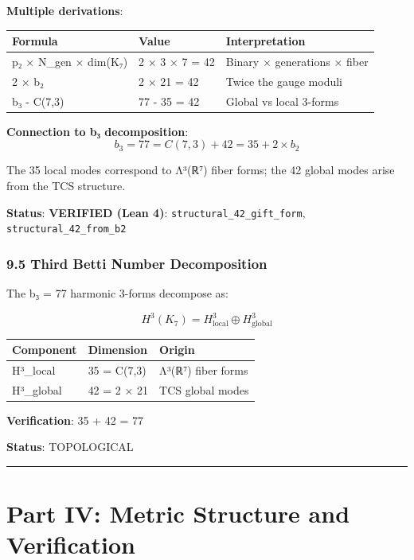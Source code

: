 \documentclass[11pt,a4paper]{article}
\begin{document}
{{{{{{{{{{{{{{{{{\textbf{Multiple derivations}:

{\def\LTcaptype{none} %
\begin{longtable}[]{@{}lll@{}}
\toprule\noalign{}
Formula & Value & Interpretation \\
\midrule\noalign{}
\endhead
\bottomrule\noalign{}
\endlastfoot
p₂ × N\_gen × dim(K₇) & 2 × 3 × 7 = 42 & Binary × generations × fiber \\
2 × b₂ & 2 × 21 = 42 & Twice the gauge moduli \\
b₃ - C(7,3) & 77 - 35 = 42 & Global vs local 3-forms \\
\end{longtable}
\textbf{Connection to b₃ decomposition}:
\[b_3 = 77 = C(7,3) + 42 = 35 + 2 \times b_2\]

The 35 local modes correspond to Λ³(ℝ⁷) fiber forms; the 42 global modes arise from the TCS structure.

\textbf{Status}: \textbf{VERIFIED (Lean 4)}: \texttt{structural\_42\_gift\_form}, \texttt{structural\_42\_from\_b2}

\subsubsection{9.5 Third Betti Number Decomposition}\label{third-betti-number-decomposition}

The b₃ = 77 harmonic 3-forms decompose as:

\[H^3(K_7) = H^3_{\text{local}} \oplus H^3_{\text{global}}\]

{\def\LTcaptype{none} %
\begin{longtable}[]{@{}lll@{}}
\toprule\noalign{}
Component & Dimension & Origin \\
\midrule\noalign{}
\endhead
\bottomrule\noalign{}
\endlastfoot
H³\_local & 35 = C(7,3) & Λ³(ℝ⁷) fiber forms \\
H³\_global & 42 = 2 × 21 & TCS global modes \\
\end{longtable}
\textbf{Verification}: 35 + 42 = 77

\textbf{Status}: TOPOLOGICAL

\begin{center}\rule{0.5\linewidth}{0.5pt}\end{center}

\section{Part IV: Metric Structure and Verification}\label{part-iv-metric-structure-and-verification}

}}}}}}}}}}}}}}}}}}}
\end{document}
